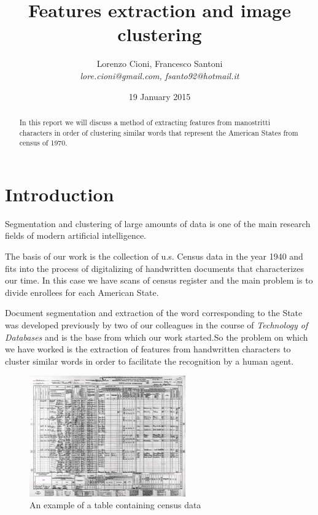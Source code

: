 \documentclass[a4paper,12pt]{article}
\title{\bf Features extraction and image clustering}
\date {19 January 2015}
\author{Lorenzo Cioni, Francesco Santoni\\\textit{{\small lore.cioni@gmail.com, fsanto92@hotmail.it}}}
\begin{document}
\maketitle

\begin{abstract}
In this report we will discuss a method of extracting features from manostritti characters in order of clustering similar words that represent the American States from census of 1970.
\end{abstract}

\tableofcontents

\section{Introduction}
Segmentation and clustering of large amounts of data is one of the main research fields of modern artificial intelligence.

The basis of our work is the collection of u.s. Census data in the year 1940 and fits into the process of digitalizing of handwritten documents that characterizes our time. In this case we have scans of census register and the main problem is to divide enrollees for each American State.

Document segmentation and extraction of the word corresponding to the State was developed previously by two of our colleagues in the course of \emph{Technology of Databases} and is the base from which our work started.So the problem on which we have worked is the extraction of features from handwritten characters to cluster similar words in order to facilitate the recognition by a human agent.

\begin{figure}[!ht]
\centering
\includegraphics[width=0.6\textwidth]{images/img1.jpg}
\caption{An example of a table containing census data}
\end{figure}
\end{document}
